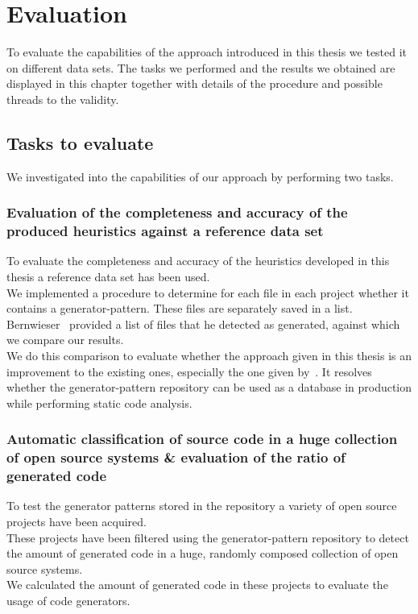 
\chapter{Evaluation}\label{chapter:evaluation}
To evaluate the capabilities of the approach introduced in this thesis we tested it on different data sets. The tasks we performed and the results we obtained are displayed in this chapter together with details of the procedure and possible threads to the validity.

\section{Tasks to evaluate}
We investigated into the capabilities of our approach by performing two tasks.

\subsection{Evaluation of the completeness and accuracy of the produced heuristics against a reference data set}
To evaluate the completeness and accuracy of the heuristics developed in this thesis a reference data set has been used.\\
We implemented a procedure to determine for each file in each project whether it contains a generator-pattern. These files are separately saved in a list. Bernwieser~\cite{Bernwieser2014} provided a list of files that he detected as generated, against which we compare our results. \\
We do this comparison to evaluate whether the approach given in this thesis is an improvement to the existing ones, especially the one given by~\cite{Bernwieser2014}. It resolves whether the generator-pattern repository can be used as a database in production while performing static code analysis.

\subsection{Automatic classification of source code in a huge collection of open source systems \& evaluation of the ratio of generated code}
To test the generator patterns stored in the repository a variety of open source projects have been acquired.\\
These projects have been filtered using the generator-pattern repository to detect the amount of generated code in a huge, randomly composed collection of open source systems.\\
We calculated the amount of generated code in these projects to evaluate the usage of code generators. 

